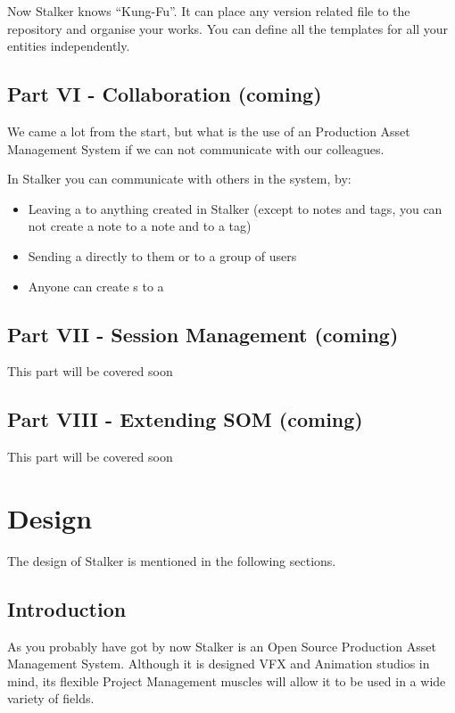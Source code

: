 \documentclass[a4paper,10pt,english]{sphinxmanual}
\begin{document}
Now Stalker knows ``Kung-Fu''. It can place any version related file to the
repository and organise your works. You can define all the templates for all
your entities independently.


\section{Part VI - Collaboration (coming)}
\label{tutorial:part-vi-collaboration-coming}
We came a lot from the start, but what is the use of an Production Asset
Management System if we can not communicate with our colleagues.

In Stalker you can communicate with others in the system, by:
\begin{itemize}
\item {} 
Leaving a  to anything created in
Stalker (except to notes and tags, you can not create a note to a note and
to a tag)

\item {} 
Sending a  directly to them or
to a group of users

\item {} 
Anyone can create s to a

\end{itemize}


\section{Part VII - Session Management (coming)}
\label{tutorial:part-vii-session-management-coming}
This part will be covered soon


\section{Part VIII - Extending SOM (coming)}
\label{tutorial:part-viii-extending-som-coming}
This part will be covered soon


\chapter{Design}
\label{design:design}\label{design::doc}\label{design:design-toplevel}
The design of Stalker is mentioned in the following sections.


\section{Introduction}
\label{design:introduction}
As you probably have got by now Stalker is an Open Source Production Asset
Management System. Although it is designed VFX and Animation studios in mind,
its flexible Project Management muscles will allow it to be used in a wide
variety of fields.
\end{document}
